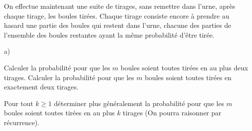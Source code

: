 \documentclass[11pt]{article}%
\begin{document}
On effectue maintenant une suite de tirages, sans remettre dans l'urne,
après chaque tirage, les boules tirées. Chaque tirage consiste encore à
prendre au hasard une partie des boules qui restent dans l'urne,
chacune des parties de l'ensemble des boules restantes ayant la même
probabilité d'être tirée.
\begin{noliste}{a)}
 \setlength{\itemsep}{2mm}
\item
Calculer la probabilité pour que les $m$ boules soient toutes tirées en
au plus deux tirages. Calculer la probabilité pour que les $m$ boules
soient toutes tirées en exactement deux tirages.
\item
Pour tout $k\geq 1$ déterminer plus généralement la probabilité pour
que les $m$ boules soient toutes tirées en au plus $k$ tirages (On
pourra raisonner par récurrence).
\end{noliste}
\end{document}
